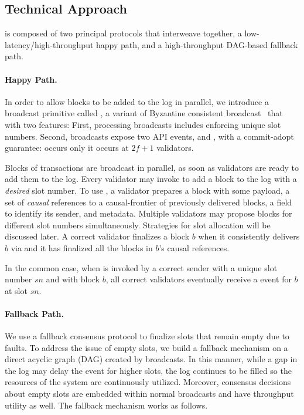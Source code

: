 \subsection{Technical Approach}

\system is composed of two principal protocols that interweave together, a low-latency/high-throughput happy path, and a high-throughput DAG-based fallback path.

\paragraph{Happy Path.}
In order to allow blocks to be added to the log in parallel,
we introduce a broadcast primitive called \primitive, a variant of Byzantine consistent broadcast~\cite{CachinGR11} that with two features: 
First, processing broadcasts includes enforcing unique slot numbers. 
Second, broadcasts expose two API events, \bbcaadopt and \bbcadeliver, with a commit-adopt guarantee: \bbcadeliver occurs only it \bbcaadopt occurs at $2f+1$ validators.

Blocks of transactions are broadcast in parallel, as soon as validators are ready to add them to the log.
Every validator may invoke \primitive to add a block to the log with a \emph{desired} slot number.
To use \primitive,
a validator prepares a block with some payload, a set of \emph{causal} references to a causal-frontier of previously delivered \primitive blocks, 
a field to identify its sender, and metadata.  
Multiple validators may propose blocks for different slot numbers simultaneously.
Strategies for slot allocation will be discussed later.
A correct validator finalizes a block $b$ when it consistently delivers $b$ via \primitive
and it has finalized all the blocks in $b$'s causal references.

In the common case, 
when \primitive is invoked by a correct sender with a unique slot number $sn$ and with block $b$, all correct validators eventually receive
 a \commit event for $b$ at slot $sn$.

\paragraph{Fallback Path.}

We use a fallback consensus protocol to finalize slots that remain empty due to faults.
To address the issue of empty slots, 
we build a fallback mechanism on a direct acyclic graph (DAG) created by \primitive broadcasts. 
In this manner, while a gap in the log may delay the \commit event for higher slots, 
the log continues to be filled so the resources of the system are continuously utilized. 
Moreover, consensus decisions about empty slots are embedded within normal broadcasts and have throughput utility as well.
The fallback mechanism works as follows.

